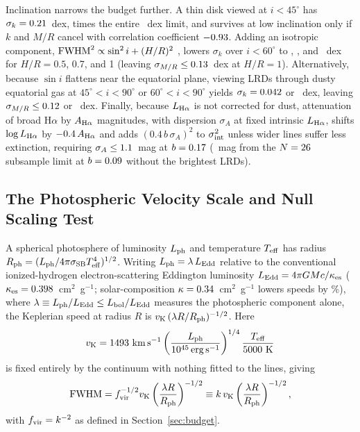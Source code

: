 \documentclass[twocolumn,linenumbers]{aastex701}
\newcommand{\Ha}{H$\alpha$}
\newcommand{\kms}{\ensuremath{{\rm km\,s^{-1}}}}
\newcommand{\ergs}{\ensuremath{{\rm erg\,s^{-1}}}}
\newcommand{\sigint}{\sigma_{\rm int}}
\newcommand{\LHa}{L_{\rm H\alpha}}
\newcommand{\Lbol}{L_{\rm bol}}
\newcommand{\Lph}{L_{\rm ph}}
\newcommand{\Rph}{R_{\rm ph}}
\newcommand{\Teff}{T_{\rm eff}}
\newcommand{\vK}{v_{\rm K}}
\begin{document}
Inclination narrows the budget further.
A thin disk viewed at $i<45^\circ$ has $\sigma_k=0.21{}$~dex, \oriThinRatio{} times the entire \FsigUp{}~dex limit, and survives at low inclination only if $k$ and $M/R$ cancel with correlation coefficient $-0.93{}$.
Adding an isotropic component, ${\rm FWHM}^{2}\propto\sin^{2}i+(H/R)^{2}$ \citep{Decarli2011}, lowers $\sigma_k$ over $i<60^\circ$ to \oriHalf{}, \oriSeven{}, and \oriOne{}~dex for $H/R=0.5$, 0.7, and 1 (leaving $\sigma_{M/R}\leq0.13{}$~dex at $H/R=1$).
Alternatively, because $\sin i$ flattens near the equatorial plane, viewing LRDs through dusty equatorial gas at $45^\circ<i<90^\circ$ or $60^\circ<i<90^\circ$ \citep{Madau2026a,Madau2026c} yields $\sigma_k=0.042{}$ or \oriEdge{}~dex, leaving $\sigma_{M/R}\leq0.12{}$ or \sigLamEdge{}~dex.
Finally, because $\LHa$ is not corrected for dust, attenuation of broad \Ha{} by $A_{\rm H\alpha}$ magnitudes, with dispersion $\sigma_A$ at fixed intrinsic $\LHa$, shifts $\log\LHa$ by $-0.4\,A_{\rm H\alpha}$ and adds $(0.4\,b\,\sigma_A)^2$ to $\sigint^2$ unless wider lines suffer less extinction, requiring $\sigma_A\leq1.1{}$~mag at $b=0.17{}$ (\sigDustNoTop{}~mag from the $N=26{}$ subsample limit at $b=0.09{}$ without the \NBright{} brightest LRDs).

\subsection{The Photospheric Velocity Scale and Null Scaling Test} \label{sec:photosphere}

A spherical photosphere of luminosity $\Lph$ and temperature $\Teff$ has radius $\Rph=(\Lph/4\pi\sigma_{\rm SB}\Teff^{4})^{1/2}$.
Writing $\Lph=\lambda\,L_{\rm Edd}$ relative to the conventional ionized-hydrogen electron-scattering Eddington luminosity $L_{\rm Edd}=4\pi GM c/\kappa_{\rm es}$ ($\kappa_{\rm es}=0.398{}$~cm$^{2}$~g$^{-1}$; solar-composition $\kappa=0.34{}$~cm$^{2}$~g$^{-1}$ lowers speeds by \vKdrop{}\%), where $\lambda\equiv\Lph/L_{\rm Edd}\leq\Lbol/L_{\rm Edd}$ measures the photospheric component alone, the Keplerian speed at radius $R$ is $\vK\,(\lambda R/\Rph)^{-1/2}$.
Here
\begin{equation} \label{eq:vk}
\vK = \vKnorm{}~\kms\left(\frac{\Lph}{10^{45}\,\ergs}\right)^{1/4}\frac{\Teff}{5000~{\rm K}}
\end{equation}
is fixed entirely by the continuum with nothing fitted to the lines, giving
\begin{equation} \label{eq:ratio}
{\rm FWHM} = f_{\rm vir}^{-1/2}\vK\left(\frac{\lambda R}{\Rph}\right)^{-1/2} \equiv k\,\vK\left(\frac{\lambda R}{\Rph}\right)^{-1/2},
\end{equation}
with $f_{\rm vir}=k^{-2}$ as defined in Section~\ref{sec:budget}.
\end{document}
